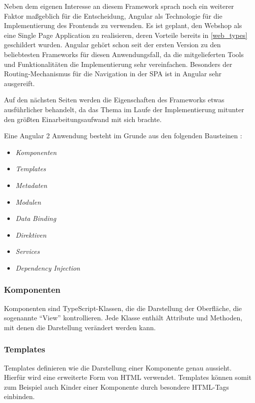 Neben dem eigenen Interesse an diesem Framework sprach noch ein weiterer Faktor maßgeblich für die Entscheidung, Angular als Technologie für die Implementierung des Frontends zu verwenden.
Es ist geplant, den Webshop als eine Single Page Application zu realisieren, deren Vorteile bereits in \cref{web_types} geschildert wurden.
Angular gehört schon seit der ersten Version zu den beliebtesten Frameworks für diesen Anwendungsfall, da die mitgelieferten Tools und Funktionalitäten die Implementierung sehr vereinfachen.
Besonders der Routing-Mechanismus für die Navigation in der \acs{SPA} ist in Angular sehr ausgereift.

Auf den nächsten Seiten werden die Eigenschaften des Frameworks etwas ausführlicher behandelt, da das Thema im Laufe der Implementierung mitunter den größten Einarbeitungsaufwand mit sich brachte.

Eine Angular 2 Anwendung besteht im Grunde aus den folgenden Bausteinen \cite{Angular.io2017}:

\begin{itemize}
	\item \textit{Komponenten}
	\item \textit{Templates} 
	\item \textit{Metadaten}
	\item \textit{Modulen}
	\item \textit{Data Binding} 
	\item \textit{Direktiven}
	\item \textit{Services}
	\item \textit{Dependency Injection}
\end{itemize}

\subsubsection{Komponenten}
Komponenten sind TypeScript-Klassen, die die Darstellung der Oberfläche, die sogenannte \enquote{View} kontrollieren.
Jede Klasse enthält Attribute und Methoden, mit denen die Darstellung verändert werden kann.

\subsubsection{Templates}
Templates definieren wie die Darstellung einer Komponente genau aussieht.
Hierfür wird eine erweiterte Form von \acs{HTML} verwendet. Templates können somit zum Beispiel auch Kinder einer Komponente durch besondere HTML-Tags einbinden.

